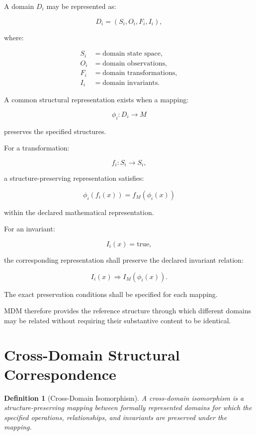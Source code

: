 \documentclass[11pt]{article}
\newtheorem{definition}{Definition}
\begin{document}
A domain $D_i$ may be represented as:

\[
D_i=(S_i,O_i,F_i,I_i),
\]

where:

\begin{align*}
S_i &= \text{domain state space},\\
O_i &= \text{domain observations},\\
F_i &= \text{domain transformations},\\
I_i &= \text{domain invariants}.
\end{align*}

A common structural representation exists when a mapping:

\[
\phi_i:D_i\rightarrow M
\]

preserves the specified structures.

For a transformation:

\[
f_i:S_i\rightarrow S_i,
\]

a structure-preserving representation satisfies:

\[
\boxed{
\phi_i(f_i(x))
=
f_M(\phi_i(x))
}
\]

within the declared mathematical representation.

For an invariant:

\[
I_i(x)=\mathrm{true},
\]

the corresponding representation shall preserve the declared
invariant relation:

\[
\boxed{
I_i(x)
\Rightarrow
I_M(\phi_i(x)).
}
\]

The exact preservation conditions shall be specified for each
mapping.

MDM therefore provides the reference structure through which
different domains may be related without requiring their
substantive content to be identical.

\section{Cross-Domain Structural Correspondence}

\begin{definition}[Cross-Domain Isomorphism]
A cross-domain isomorphism is a structure-preserving mapping
between formally represented domains for which the specified
operations, relationships, and invariants are preserved under
the mapping.
\end{definition}
\end{document}
